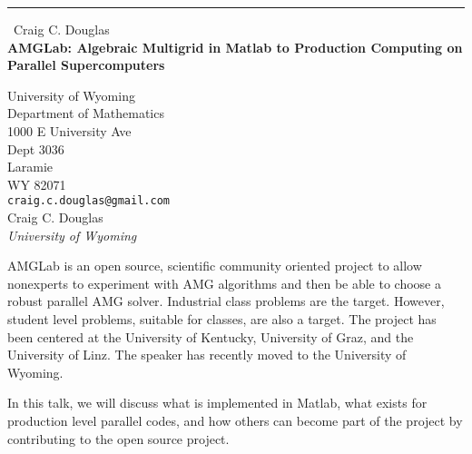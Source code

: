 \documentclass{report}
\begin{document}
\begin{center}
\rule{6in}{1pt} \
{\large Craig C. Douglas \\
{\bf AMGLab: Algebraic Multigrid in Matlab to Production Computing on Parallel Supercomputers}}

University of Wyoming \\ Department of Mathematics \\ 1000 E University Ave  \\ Dept 3036 \\ Laramie \\ WY 82071
\\
{\tt craig.c.douglas@gmail.com}\\
Craig C. Douglas\\
{\em University of Wyoming}\end{center}

AMGLab is an open source, scientific community oriented project to allow
nonexperts to experiment with AMG algorithms and then be able to choose a
robust parallel AMG solver. Industrial class problems are the target.
However, student level problems, suitable for classes, are also a target.
The project has been centered at the University of Kentucky, University
of Graz, and the University of Linz. The speaker has recently moved to
the University of Wyoming.

In this talk, we will discuss what is implemented in Matlab, what exists
for production level parallel codes, and how others can become part of
the project by contributing to the open source project.
\end{document}
